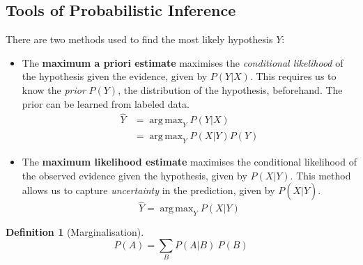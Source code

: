 \documentclass[12pt,a4paper,twoside,openright]{report}
\DeclareMathOperator*{\argmax}{arg\,max}
\theoremstyle{definition}
\newtheorem{definition}{Definition}[section]
\begin{document}
\subsection{Tools of Probabilistic Inference}


There are two methods used to find the most likely hypothesis $Y$:
\begin{itemize}
  \item  The \textbf{maximum a priori estimate} maximises the \textit{conditional likelihood} of the hypothesis given the evidence, given by $P(Y|X)$. This requires us to know the \textit{prior} $P(Y)$, the distribution of the hypothesis, beforehand. The prior can be learned from labeled data.
    \begin{equation}
      \begin{aligned}
        \hat{Y} &= \argmax_Y P(Y|X) \\
                &= \argmax_Y P(X|Y)P(Y)
      \end{aligned}
      \label{eq:map}
    \end{equation}
  \item  The \textbf{maximum likelihood estimate} maximises the conditional likelihood of the observed evidence given the hypothesis, given by $P(X|Y)$. This method allows us to capture \textit{uncertainty} in the prediction, given by $P(X|\hat{Y})$. 
    \begin{equation}
      \hat{Y} = \argmax_Y P(X|Y)
      \label{eq:mle}
    \end{equation}
\end{itemize}
%
%
\begin{definition}[Marginalisation]
\begin{equation}
  P(A) = \sum\limits_B P(A|B)~P(B)
  \label{eq:marginalisation}
\end{equation}
\end{definition}
\end{document}
